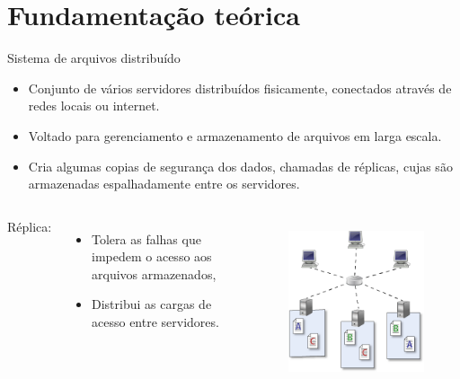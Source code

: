 \section{Fundamentação teórica}

\begin{frame}{Sistema de arquivos distribuído}
	\begin{itemize}
		\item Conjunto de vários servidores distribuídos fisicamente, conectados através de redes locais ou internet.
		\item Voltado para gerenciamento e armazenamento de arquivos em larga escala.
		\item Cria algumas copias de segurança dos dados, chamadas de réplicas, cujas são armazenadas espalhadamente entre os servidores.
	\end{itemize}
\end{frame}

\begin{frame}{}
	\begin{columns}
		Réplica:
		\begin{itemize}
			\item Tolera as falhas que impedem o acesso aos arquivos armazenados,
			\item Distribui as cargas de acesso entre servidores.
		\end{itemize}
		
		\begin{figure}
			\includegraphics[width=\textwidth]{imagens/image1}
			\label{fig:exemplo}
		\end{figure}
		
		
	\end{columns}
\end{frame}


